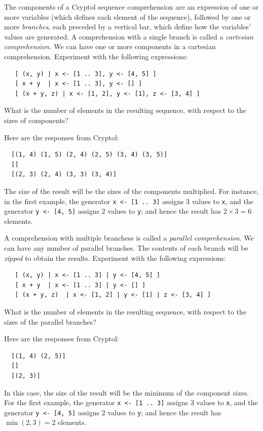 \begin{Exercise}\label{ex:seq:4}
  The components of a Cryptol sequence comprehension are an expression
  of one or more variables (which defines each element of the
  sequence), followed by one or more \emph{branches}, each preceded by
  a vertical bar, which define how the variables' values are
  generated. A comprehension with a single branch is called a
  \emph{cartesian comprehension}. We can have one or more components
  in a cartesian comprehension. Experiment with the following
  expressions:\indComp\indCartesian
\begin{Verbatim}
   [ (x, y) | x <- [1 .. 3], y <- [4, 5] ]
   [ x + y  | x <- [1 .. 3], y <- [] ]
   [ (x + y, z) | x <- [1, 2], y <- [1], z <- [3, 4] ]
\end{Verbatim}
What is the number of elements in the resulting sequence, with respect
to the sizes of components?

\end{Exercise}
\begin{Answer}
Here are the responses from Cryptol:
\begin{Verbatim}
  [(1, 4) (1, 5) (2, 4) (2, 5) (3, 4) (3, 5)]
  []
  [(2, 3) (2, 4) (3, 3) (3, 4)]
\end{Verbatim}
The size of the result will be the sizes of the components
multiplied. For instance, in the first example, the generator
\texttt{x <- [1 ..\ 3]} assigns 3 values to \texttt{x}, and the generator
\texttt{y <- [4, 5]} assigns 2 values to \texttt{y}; and hence the result has
$2\times 3 = 6$ elements.
\end{Answer}

\begin{Exercise}\label{ex:seq:5}\indParallel\indComp
  A comprehension with multiple branchess is called a \emph{parallel
    comprehension}. We can have any number of parallel branches. The
  contents of each branch will be \emph{zipped} to obtain the results.
  Experiment with the following expressions:
\begin{Verbatim}
   [ (x, y) | x <- [1 .. 3] | y <- [4, 5] ]
   [ x + y  | x <- [1 .. 3] | y <- [] ]
   [ (x + y, z)  | x <- [1, 2] | y <- [1] | z <- [3, 4] ]
\end{Verbatim}
What is the number of elements in the resulting sequence, with respect
to the sizes of the parallel branches?
\end{Exercise}
\begin{Answer}
Here are the responses from Cryptol:
\begin{Verbatim}
  [(1, 4) (2, 5)]
  []
  [(2, 3)]
\end{Verbatim}
In this case, the size of the result will be the minimum of the
component sizes. For the first example, the generator
\texttt{x <- [1 ..\ 3]} assigns 3 values to \texttt{x}, and the generator
\texttt{y <- [4, 5]} assigns 2 values to \texttt{y}; and hence the result has
$\min(2,3) = 2$ elements.
\end{Answer}

